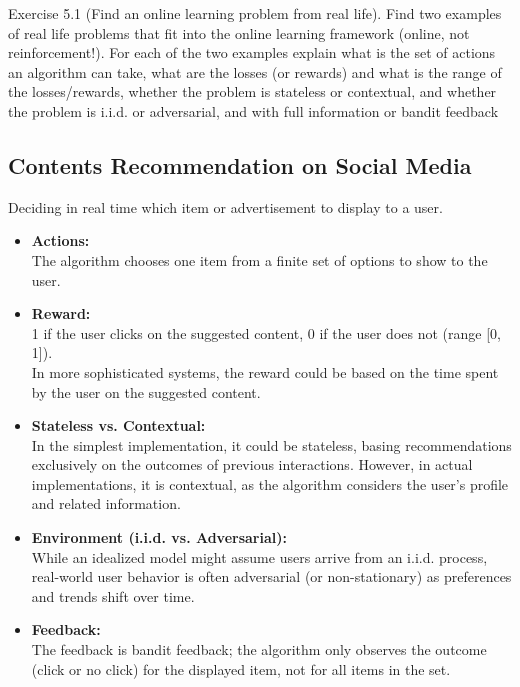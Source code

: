 Exercise 5.1 (Find an online learning problem from real life). Find two examples of real life problems
that fit into the online learning framework (online, not reinforcement!). For each of the two examples
explain what is the set of actions an algorithm can take, what are the losses (or rewards) and what is the
range of the losses/rewards, whether the problem is stateless or contextual, and whether the problem is
i.i.d. or adversarial, and with full information or bandit feedback

\subsection{Contents Recommendation on Social Media}

Deciding in real time which item or advertisement to display to a user.

\begin{itemize}
\item \textbf{Actions:} \\
The algorithm chooses one item from a finite set of options to show to the user.

\item \textbf{Reward:} \\
1 if the user clicks on the suggested content, 0 if the user does not (range [0, 1]). \\
In more sophisticated systems, the reward could be based on the time spent by the user on the suggested content.

\item \textbf{Stateless vs. Contextual:} \\
In the simplest implementation, it could be stateless, basing recommendations exclusively on the outcomes of previous interactions.
However, in actual implementations, it is contextual, as the algorithm considers the user's profile and related information.

\item \textbf{Environment (i.i.d. vs. Adversarial):} \\
While an idealized model might assume users arrive from an i.i.d. process, real-world user behavior is often adversarial (or non-stationary) as preferences and trends shift over time.

\item \textbf{Feedback:} \\
The feedback is bandit feedback; the algorithm only observes the outcome (click or no click) for the displayed item, not for all items in the set.
\end{itemize}

